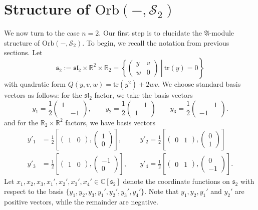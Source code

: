 \documentclass[reqno, 11pt]{amsart} %
\numberwithin{equation}{section}
\theoremstyle{plain}
\theoremstyle{definition}
\theoremstyle{remark}
\newcommand{\tr}{\mathrm{tr}}
\newcommand{\mcS}{\mathcal{S}}
\newcommand{\bbC}{\mathbb C}
\newcommand{\lie}[1]{ \mathfrak{#1}}
\newcommand{\Orb}{\mathrm{Orb}}
\begin{document}
\section{Structure of $\Orb(-,{\mcS_2})$} \label{sec:Orb(S2)}
We now turn to the case $n=2$. Our first step is to elucidate the $\lie A$-module structure of $\Orb(-,\mathcal S_2)$.
To begin, we recall the notation from previous sections. Let
\[
\lie{s}_2 := \lie{sl}_2 \times \mathbb R^2 \times \mathbb R_2 = \left.\left\{  \begin{pmatrix} y & v \\ w & 0 \end{pmatrix} \ \right\vert \ \tr(y) = 0  \right\}
\]
with quadratic form $Q(y,v,w) = \tr(y^2) + 2 wv$.  We choose standard basis vectors as follows: for the $\lie{sl}_2$ factor, we take the basis vectors
\[
y_1 = \frac{1}{ 2} \begin{pmatrix} 1 & \\ & -1 \end{pmatrix} , \qquad y_2  = \frac{1}{ 2} \begin{pmatrix} &1  \\ 1 &  \end{pmatrix} \qquad y_3  = \frac{1}{ 2} \begin{pmatrix} & 1\\-1 &  \end{pmatrix}.
\]
and for the $\mathbb R_2 \times \mathbb R^2$ factors, we have basis vectors	
\begin{equation}\label{eq:standard_basis_R_2}	
\begin{aligned}
y'_1 &= \frac1{{2}} \left[ \begin{pmatrix}1 & 0 \end{pmatrix}, \begin{pmatrix} 1 \\ 0 \end{pmatrix} \right],  && y'_2 = \frac1{{2}} \left[ \begin{pmatrix}0 & 1 \end{pmatrix}, \begin{pmatrix} 0 \\ 1 \end{pmatrix} \right]   \\
y'_3 &= \frac1{{2}} \left[ \begin{pmatrix}1 & 0 \end{pmatrix}, \begin{pmatrix} -1 \\ 0 \end{pmatrix} \right], \ 	 && y'_4= \frac1{{2}} \left[ \begin{pmatrix}0 & 1 \end{pmatrix}, \begin{pmatrix} 0 \\ -1 \end{pmatrix} \right].
\end{aligned}
\end{equation}
 Let $x_1, x_2, x_3, x_1', x_2', x_3', x_4' \in \bbC[\lie s_2]$ denote the coordinate functions on $\lie s_2$ with respect to the basis $\{ y_1, y_2, y_3, y_1', y_2', y_3', y_4' \}$.
Note that $y_1, y_2, y_1'$ and $y_2'$ are positive vectors, while the remainder are negative.
\end{document}
